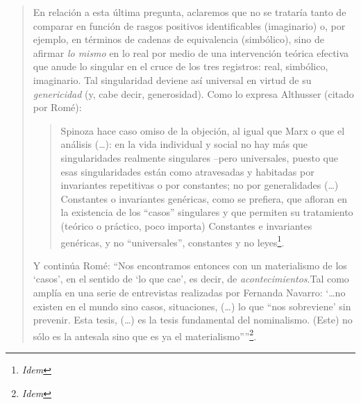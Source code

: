 \begin{quote}
En relación a esta última pregunta, aclaremos que no se trataría tanto de comparar en función de rasgos positivos identificables (imaginario) o, por ejemplo, en términos de cadenas de equivalencia (simbólico), sino de afirmar \emph{lo mismo} en lo real por medio de una intervención teórica efectiva que anude lo singular en el cruce de los tres registros: real, simbólico, imaginario. Tal singularidad deviene así universal en virtud de su \emph{genericidad} (y, cabe decir, generosidad). Como lo expresa Althusser (citado por Romé):

\begin{quote}
Spinoza hace caso omiso de la objeción, al igual que Marx o que el análisis (\dots): en la vida individual y social no hay más que singularidades realmente singulares --pero universales, puesto que esas singularidades están como atravesadas y habitadas por invariantes repetitivas o por constantes; no por generalidades (\dots) Constantes o invariantes genéricas, como se prefiera, que afloran en la existencia de los \enquote{casos} singulares y que permiten su tratamiento (teórico o práctico, poco importa) Constantes e invariantes genéricas, y no \enquote{universales}, constantes y no leyes\footnote{\emph{Idem}}.
\end{quote}

Y continúa Romé: \enquote{Nos encontramos entonces con un materialismo de los \enquote{casos}, en el sentido de \enquote{lo que cae}, es decir, de \emph{acontecimientos}.Tal como amplía en una serie de entrevistas realizadas por Fernanda Navarro: \enquote{\ldots no existen en el mundo sino casos, situaciones, (\dots) lo que ``nos sobreviene} sin prevenir. Esta tesis, (\dots) es la tesis fundamental del nominalismo. (Este) no sólo es la antesala sino que es ya el materialismo''}\footnote{\emph{Idem}}.


\end{quote}

